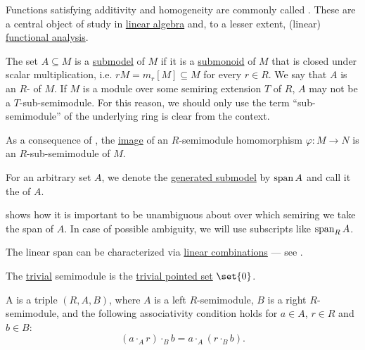 \begin{definition}
\begin{thmenum}[resume=def:semimodule]
    Functions satisfying additivity and homogeneity are commonly called . These are a central object of study in \hyperref[sec:linear_algebra]{linear algebra} and, to a lesser extent, (linear) \hyperref[sec:functional_analysis]{functional analysis}.

     The set \( A \subseteq M \) is a \hyperref[thm:substructure_is_model]{submodel} of \( M \) if it is a \hyperref[def:monoid/submodel]{submonoid} of \( M \) that is closed under scalar multiplication, i.e. \( rM = m_r[M] \subseteq M \) for every \( r \in R \). We say that \( A \) is an \( R \)- of \( M \). If \( M \) is a module over some semiring extension \( T \) of \( R \), \( A \) may not be a \( T \)-sub-semimodule. For this reason, we should only use the term \enquote{sub-semimodule} of the underlying ring is clear from the context.

    As a consequence of , the \hyperref[def:multi_valued_function/image]{image} of an \( R \)-semimodule homomorphism \( \varphi: M \to N \) is an \( R \)-sub-semimodule of \( M \).

    For an arbitrary set \( A \), we denote the \hyperref[def:first_order_generated_substructure]{generated submodel} by \( \operatorname{span}{ A } \) and call it the  of \( A \).

     shows how it is important to be unambiguous about over which semiring we take the span of \( A \). In case of possible ambiguity, we will use subscripts like \( \operatorname{span}_R A \).

    The linear span can be characterized via \hyperref[rem:linear_combinations]{linear combinations} --- see .

     The \hyperref[thm:substructures_form_complete_lattice/bottom]{trivial} semimodule is the \hyperref[def:pointed_set/trivial]{trivial pointed set} \( \set{ 0 } \).

     A  is a triple \( (R, A, B) \), where \( A \) is a left \( R \)-semimodule, \( B \) is a right \( R \)-semimodule, and the following associativity condition holds for \( a \in A \), \( r \in R \) and \( b \in B \):
    \begin{equation}\label{eq:def:semimodule/bimodule/associativity}
      (a \cdot_A r) \cdot_B b = a \cdot_A (r \cdot_B b).
    \end{equation}


\end{thmenum}
\end{definition}
